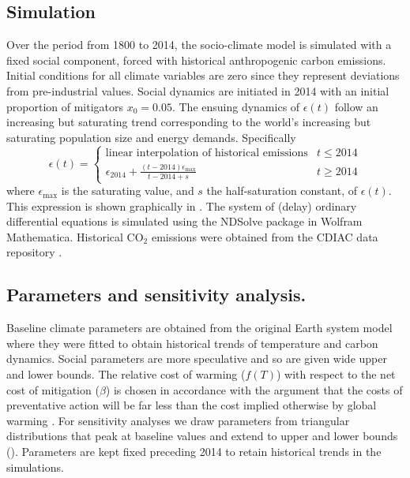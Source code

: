\documentclass[10pt,letterpaper]{article}
\providecommand{\DIFaddbegin}{} %
\providecommand{\DIFaddend}{} %
\providecommand{\DIFdelbegin}{} %
\providecommand{\DIFdelend}{} %
\begin{document}
\subsection*{Simulation} Over the period from 1800 to 2014, the socio-climate model is simulated with a fixed social component, forced with historical anthropogenic carbon emissions. Initial conditions for all climate variables are zero since they represent deviations from pre-industrial values. Social dynamics are initiated in 2014 with an initial proportion of mitigators $x_0=0.05$. The ensuing dynamics of $\epsilon(t)$ follow an increasing but saturating trend corresponding to the world's increasing but saturating population size and energy demands. Specifically
\begin{equation}
\epsilon(t) = 
\begin{cases}
\text{linear interpolation of historical emissions} & t\leq 2014 \\[5pt]
\epsilon_{2014} + \frac{(t-2014)\epsilon_{\text{max}}}{t-2014+s} & t \geq 2014
\end{cases}
\end{equation}
where $\epsilon_{\text{max}}$ is the saturating value, and $s$ the half-saturation constant, of $\epsilon(t)$. This expression is shown graphically in \DIFdelbegin %
\DIFdelend \DIFaddbegin {}\DIFaddend . The system of (delay) ordinary differential equations is simulated using the NDSolve package in Wolfram Mathematica. Historical $\text{CO}_2$ emissions were obtained from the CDIAC data repository \cite{boden17}. 





\subsection*{Parameters and sensitivity analysis.} Baseline climate parameters are obtained from the original Earth system model \cite{lenton00} where they were fitted to obtain historical trends of temperature and carbon dynamics. Social parameters are more speculative and so are given wide upper and lower bounds. The relative cost of warming ($f(T)$) with respect to the net cost of mitigation ($\beta$) is chosen in accordance with the argument that the costs of preventative action will be far less than the cost implied otherwise by global warming \cite{stern06}. For sensitivity analyses we draw parameters from triangular distributions that peak at baseline values and extend to upper and lower bounds (). Parameters are kept fixed preceding 2014 to retain historical trends in the simulations.
\end{document}
